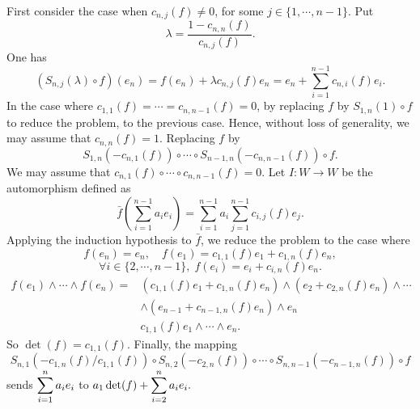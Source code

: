 \begin{proofenv}
    \quad First consider the case when $c_{n,j}(f) \neq 0$, for some $j \in \{1,\cdots,n-1\}$.
    Put
    $$\lambda = \frac{1 - c_{n,n}(f)}{c_{n,j}(f)}.$$
    One has
    $$\left(S_{n,j}(\lambda)\circ f\right)(e_n) = f(e_n) + \lambda c_{n,j}(f) e_n = e_n + \sum_{i=1}^{n-1}c_{n,i}(f)e_{i}.$$
    In the case where $c_{1,1}(f) = \cdots = c_{n,n-1}(f) = 0$, by replacing $f$ by $S_{1,n}(1) \circ f$ to reduce the problem, to the previous case.
    Hence, without loss of generality, we may assume that $c_{n,n}(f) = 1$.
    Replacing $f$ by
    $$S_{1,n}(-c_{n,1}(f)) \circ \cdots \circ S_{n-1,n}(-c_{n,n-1}(f)) \circ f.$$
    We may assume that $c_{n,1}(f) \circ \cdots \circ c_{n,n-1}(f) = 0$.
    Let $I: W\rightarrow W$ be the automorphism defined as
    $$\bar{f}(\sum_{i=1}^{n-1}a_i e_i) = \sum_{i=1}^{n-1}a_i \sum_{j=1}^{n-1}c_{i,j}(f)e_j.$$
    Applying the induction hypothesis to $\bar{f}$, we reduce the problem to the case where
    $$f(e_n) = e_n,\quad f(e_1) = c_{1,1} (f) e_1 + c_{1,n} (f) e_n,$$
    $$\forall i \in \{2,\cdots,n-1\},\; f(e_i) = e_i + c_{i,n}(f) e_n.$$
    $$\begin{aligned}
        f(e_1) \wedge \cdots \wedge f(e_n) = & \left(c_{1,1}(f)e_1 + c_{1,n}(f) e_n\right) \wedge \left(e_2 + c_{2,n}(f) e_n\right) \wedge \cdots\\
            & \wedge \left(e_{n-1} + c_{n-1,n}(f) e_n\right) \wedge e_n\\
            & c_{1,1}(f) e_1 \wedge \cdots \wedge e_n.
    \end{aligned}$$
    So $\det(f) = c_{1,1} (f)$.
    Finally, the mapping
    $$S_{n,1}\left(-c_{1,n}(f)/c_{1,1}(f)\right) \circ S_{n,2}(-c_{2,n}(f)) \circ \cdots \circ S_{n,n-1}(-c_{n-1,n}(f)) \circ f$$
    sends $\displaystyle \sum_{i=1}^{n}a_ie_i$ to $\displaystyle a_1 \det(f) + \sum_{i=2}^{n}a_ie_i.$
\end{proofenv}

